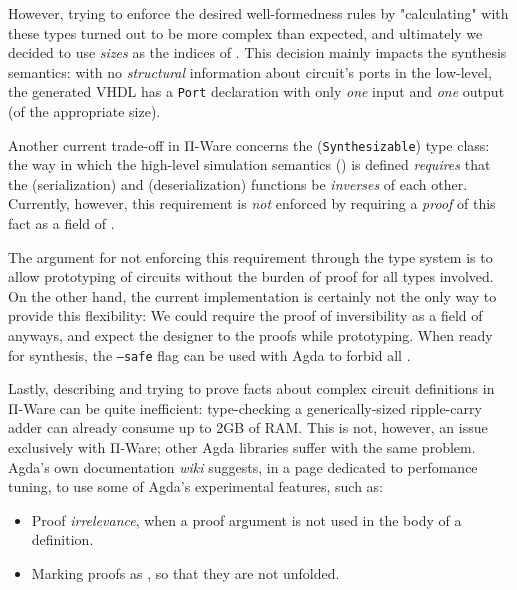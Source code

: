             However, trying to enforce the desired well-formedness rules by "calculating" with these types
            turned out to be more complex than expected, and ultimately we decided to use
            \emph{sizes} as the indices of .
            This decision mainly impacts the synthesis semantics:
            with no \emph{structural} information about circuit's ports in the low-level,
            the generated \ac{VHDL} has a \texttt{Port} declaration with only
            \emph{one} input and \emph{one} output (of the appropriate size).


            Another current trade-off in Π-Ware concerns the  (\texttt{Synthesizable})
            type class: the way in which the high-level simulation semantics () is defined
            \emph{requires} that the  (serialization) and  (deserialization) functions
            be \emph{inverses} of each other.
            Currently, however, this requirement is \emph{not} enforced by requiring a \emph{proof} of
            this fact as a field of .

            The argument for not enforcing this requirement through the type system is to allow
            prototyping of circuits without the burden of proof for all types involved.
            On the other hand, the current implementation is certainly not the only way to provide this flexibility:
            We could require the proof of inversibility as a field of  anyways,
            and expect the designer to  the proofs while prototyping.
            When ready for synthesis, the \texttt{--safe} flag can be used with Agda to forbid all .

            Lastly, describing and trying to prove facts about complex circuit definitions in Π-Ware
            can be quite inefficient: type-checking a generically-sized ripple-carry adder can already
            consume up to 2GB of RAM.
            This is not, however, an issue exclusively with Π-Ware; other Agda libraries suffer with the same problem.
            Agda's own documentation \emph{wiki} suggests, in a page dedicated to perfomance tuning,
            to use some of Agda's experimental features, such as:

            \begin{itemize}
                \item Proof \emph{irrelevance}, when a proof argument is not used in the body of a definition.
                \item Marking proofs as , so that they are not unfolded.
            \end{itemize}

